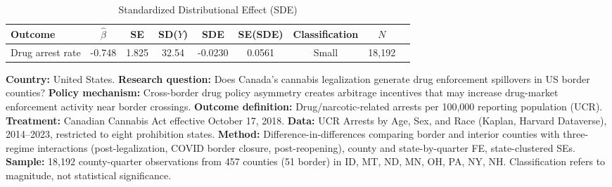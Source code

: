 \begin{table}[htbp]
\centering
\caption{Standardized Distributional Effect (SDE)}
\label{tab:sde}
\begin{tabular}{lcccccccc}
\hline\hline
Outcome & $\hat{\beta}$ & SE & SD($Y$) & SDE & SE(SDE) & Classification & $N$ \\
\hline
Drug arrest rate & -0.748 & 1.825 & 32.54 & -0.0230 & 0.0561 & Small & 18,192 \\
\hline\hline
\end{tabular}
\begin{tablenotes}[flushleft]
\small
\item \textbf{Country:} United States. \textbf{Research question:} Does Canada's cannabis legalization generate drug enforcement spillovers in US border counties? \textbf{Policy mechanism:} Cross-border drug policy asymmetry creates arbitrage incentives that may increase drug-market enforcement activity near border crossings. \textbf{Outcome definition:} Drug/narcotic-related arrests per 100,000 reporting population (UCR). \textbf{Treatment:} Canadian Cannabis Act effective October 17, 2018. \textbf{Data:} UCR Arrests by Age, Sex, and Race (Kaplan, Harvard Dataverse), 2014--2023, restricted to eight prohibition states. \textbf{Method:} Difference-in-differences comparing border and interior counties with three-regime interactions (post-legalization, COVID border closure, post-reopening), county and state-by-quarter FE, state-clustered SEs. \textbf{Sample:} 18,192 county-quarter observations from 457 counties (51 border) in ID, MT, ND, MN, OH, PA, NY, NH. Classification refers to magnitude, not statistical significance.
\end{tablenotes}
\end{table}
